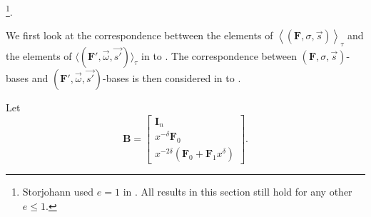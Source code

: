 \footnote{Storjohann used $e=1$ in \citep{Storjohann:2006}. All results in
this section still hold for any other $e\le1.$%
}. %
\begin{comment}
In fact, it is quite easy to construct a $(\check{\mathbf{F}},\vec{\omega},\vec{s'})$-basis
from a $\left(\mathbf{F},\sigma,\vec{s}\right)$-basis, as we show
later in \prettyref{lem:FtoAbasis}. However, it requires more work
to extract a $\left(\mathbf{F},\sigma,\vec{s}\right)$-basis from
a $(\check{\mathbf{F}},\vec{\omega},\vec{s'})$-basis, which is addressed
eventually in \prettyref{cor:extractingFbasisFromGbasis}. Note that
although constructing a $(\check{\mathbf{F}},\vec{\omega},\vec{s'})$-basis
from a $\left(\mathbf{F},\sigma,\vec{s}\right)$-basis in \prettyref{lem:FtoAbasis}
is the reverse of what we want, this well-formed $(\check{\mathbf{F}},\vec{\omega},\vec{s'})$-basis
restricts the elements of $\langle(\check{\mathbf{F}},\vec{\omega},\vec{s'})\rangle$
to a simple form shown in \prettyref{cor:FtauBasisForm}, which helps
to establish a close correspondence between a $(\check{\mathbf{F}},\vec{\omega},\vec{s'})$-basis
and a $\left(\mathbf{F},\sigma,\vec{s}\right)$-basis in \prettyref{lem:2delta-1Basis},
\prettyref{lem:2deltaBasis}, and \prettyref{thm:mainTheorem}. 
\end{comment}


We first look at the correspondence bettween the elements of $\left\langle \left(\mathbf{F},\sigma,\vec{s}\right)\right\rangle _{\tau}$
and the elements of $\langle(\mathbf{F}',\vec{\omega},\vec{s'})\rangle_{\tau}$
in  to . The
correspondence between $\left(\mathbf{F},\sigma,\vec{s}\right)$-bases
and $(\mathbf{F}',\vec{\omega},\vec{s'})$-bases is then considered
in  to .

Let 
\[
\mathbf{B}=\left[\begin{array}{c}
\mathbf{I}_{n}\\
x^{-\delta}\mathbf{F}_{0}\\
x^{-2\delta}\left(\mathbf{F}_{0}+\mathbf{F}_{1}x^{\delta}\right)
\end{array}\right].
\]

